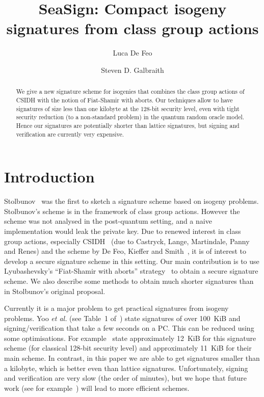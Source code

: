 \documentclass{llncs}
\title{SeaSign: Compact isogeny signatures from class group actions}
\author{Luca De Feo\inst{1}\orcidID{0000-0002-9321-0773}
 \and Steven D. Galbraith\inst{2}\orcidID{0000-0001-7114-8377}}
\institute{
Universit{\' e} Paris-Saclay -- UVSQ, LMV, UMR CNRS 8100, Versailles, FR.
\url{https://defeo.lu/}
\and
Mathematics Department, University of Auckland, NZ.
\email{s.galbraith@auckland.ac.nz}
}
\begin{document}
\pagestyle{plain}

\maketitle


\begin{abstract}
We give a new signature scheme for isogenies that combines the class group actions of CSIDH with the notion of Fiat-Shamir with aborts.
Our techniques allow to have signatures of size less than one kilobyte at the 128-bit security level, even with tight security reduction (to a non-standard problem) in the quantum random oracle model.
Hence our signatures are potentially shorter than lattice signatures, but signing and verification are currently very expensive.
\end{abstract}



\section{Introduction}

Stolbunov~\cite{Sto12} was the first to sketch a signature scheme based on isogeny problems.
Stolbunov's scheme is in the framework of class group actions.
However the scheme was not analysed in the post-quantum setting, and a naive implementation would leak the private key.
Due to renewed interest in class group actions, especially CSIDH~\cite{CLMPR18} (due to Castryck, Lange, Martindale, Panny and Renes) and the scheme by De Feo, Kieffer and Smith~\cite{DFKS18}, it is of interest to develop a secure signature scheme in this setting.
Our main contribution is to use Lyubashevsky's ``Fiat-Shamir with aborts'' strategy~\cite{Lyu09} to obtain a secure signature scheme.
We also describe some methods to obtain much shorter signatures than in Stolbunov's original proposal.




Currently it is a major problem to get practical signatures from isogeny problems.
Yoo \emph{et al.} (see Table~1 of~\cite{YAJJS17}) state signatures of over 100~KiB
and signing/ve\-ri\-fi\-ca\-tion that take a few seconds on a PC.
This can be reduced using some optimisations. For example~\cite{GPS17} state approximately 12~KiB for this signature scheme (for classical 128-bit security level) and approximately 11~KiB for their main scheme.
In contrast, in this paper we are able to get signatures smaller than a kilobyte, which is better even than lattice signatures.
Unfortunately, signing and verification are very slow (the order of minutes), but we 
hope that future work (see for example~\cite{DPV19}) will lead to more efficient schemes.
\end{document}
